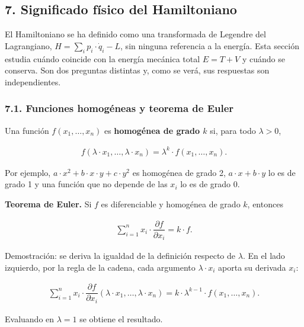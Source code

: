\documentclass[
  spanish,
]{article}
\begin{document}
\subsection{7. Significado físico del
Hamiltoniano}\label{significado-fuxedsico-del-hamiltoniano}

El Hamiltoniano se ha definido como una transformada de Legendre del
Lagrangiano, \(H = \sum_i p_i \cdot \dot{q}_i - L\), sin ninguna
referencia a la energía. Esta sección estudia cuándo coincide con la
energía mecánica total \(E = T + V\) y cuándo se conserva. Son dos
preguntas distintas y, como se verá, sus respuestas son independientes.

\subsubsection{7.1. Funciones homogéneas y teorema de
Euler}\label{funciones-homoguxe9neas-y-teorema-de-euler}

Una función \(f(x_1, \dots, x_n)\) es \textbf{homogénea de grado \(k\)}
si, para todo \(\lambda > 0\),

\[
\begin{aligned}
f(\lambda \cdot x_1, \dots, \lambda \cdot x_n) = \lambda^k \cdot f(x_1, \dots, x_n).
\end{aligned}
\]

Por ejemplo, \(a \cdot x^2 + b \cdot x \cdot y + c \cdot y^2\) es
homogénea de grado 2, \(a \cdot x + b \cdot y\) lo es de grado 1 y una
función que no depende de las \(x_i\) lo es de grado 0.

\textbf{Teorema de Euler.} Si \(f\) es diferenciable y homogénea de
grado \(k\), entonces

\[
\begin{aligned}
\sum_{i=1}^{n} x_i \cdot \dfrac{\partial f}{\partial x_i} = k \cdot f.
\end{aligned}
\]

Demostración: se deriva la igualdad de la definición respecto de
\(\lambda\). En el lado izquierdo, por la regla de la cadena, cada
argumento \(\lambda \cdot x_i\) aporta su derivada \(x_i\):

\[
\begin{aligned}
\sum_{i=1}^{n} x_i \cdot \dfrac{\partial f}{\partial x_i}(\lambda \cdot x_1, \dots, \lambda \cdot x_n) = k \cdot \lambda^{k-1} \cdot f(x_1, \dots, x_n).
\end{aligned}
\]

Evaluando en \(\lambda = 1\) se obtiene el resultado.
\end{document}
